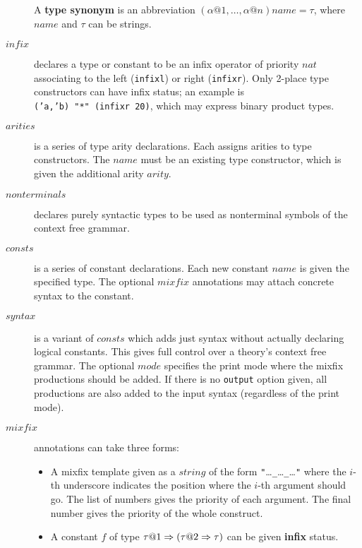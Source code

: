 \begin{description}
  A {\bf type synonym} is an abbreviation
  $(\alpha@1,\dots,\alpha@n)name = \tau$, where $name$ and $\tau$ can
  be strings.

\item[$infix$]
  declares a type or constant to be an infix operator of priority $nat$
  associating to the left ({\tt infixl}) or right ({\tt infixr}).  Only
  2-place type constructors can have infix status; an example is {\tt
  ('a,'b)~"*"~(infixr~20)}, which may express binary product types.

\item[$arities$] is a series of type arity declarations.  Each assigns
  arities to type constructors.  The $name$ must be an existing type
  constructor, which is given the additional arity $arity$.
  
\item[$nonterminals$] declares purely
  syntactic types to be used as nonterminal symbols of the context
  free grammar.

\item[$consts$] is a series of constant declarations.  Each new
  constant $name$ is given the specified type.  The optional $mixfix$
  annotations may attach concrete syntax to the constant.
  
\item[$syntax$]  is a variant
  of $consts$ which adds just syntax without actually declaring
  logical constants.  This gives full control over a theory's context
  free grammar.  The optional $mode$ specifies the print mode where the
  mixfix productions should be added.  If there is no \texttt{output}
  option given, all productions are also added to the input syntax
  (regardless of the print mode).

\item[$mixfix$] 
  annotations can take three forms:
  \begin{itemize}
  \item A mixfix template given as a $string$ of the form
    {\tt"}\dots{\tt\_}\dots{\tt\_}\dots{\tt"} where the $i$-th underscore
    indicates the position where the $i$-th argument should go.  The list
    of numbers gives the priority of each argument.  The final number gives
    the priority of the whole construct.

  \item A constant $f$ of type $\tau@1\To(\tau@2\To\tau)$ can be given {\bf
    infix} status.


\end{itemize}
\end{description}
